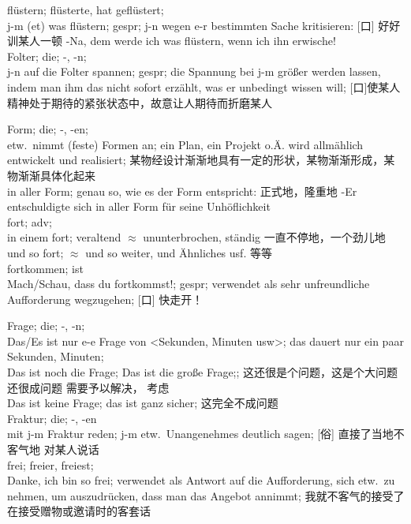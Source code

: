 \noindent
fl\"ustern; fl\"usterte, hat gefl\"ustert;\\
j-m (et) was fl\"ustern; gespr; j-n wegen e-r bestimmten Sache kritisieren: [口] 好好训某人一顿 -Na, dem werde ich was fl\"ustern, wenn ich ihn erwische! \\

\noindent
Folter; die; -, -n;\\
j-n auf die Folter spannen; gespr; die Spannung bei j-m gr\"o\ss{}er werden lassen, indem man ihm das nicht sofort erz\"ahlt, was er unbedingt wissen will; [口]使某人精神处于期待的紧张状态中，故意让人期待而折磨某人

\noindent
Form; die; -, -en; \\
etw.\ nimmt (feste) Formen an; ein Plan, ein Projekt o.\"A. wird allm\"ahlich entwickelt und realisiert; 某物经设计渐渐地具有一定的形状，某物渐渐形成，某物渐渐具体化起来\\
in aller Form; genau so, wie es der Form entspricht: 正式地，隆重地 -Er entschuldigte sich in aller Form f\"ur seine Unh\"oflichkeit \\

\noindent
fort; adv; \\
in einem fort; veraltend $\approx$ ununterbrochen, st\"andig 一直不停地，一个劲儿地\\
und so fort; $\approx$ und so weiter, und \"Ahnliches usf. 等等\\

\noindent
fortkommen; ist \\
Mach/Schau, dass du fortkommst!; gespr; verwendet als sehr unfreundliche Aufforderung wegzugehen; [口] 快走开！

\noindent
Frage; die; -, -n; \\
Das/Es ist nur e-e Frage von <Sekunden, Minuten usw>; das dauert nur ein paar Sekunden, Minuten; \\
Das ist noch die Frage; Das ist die gro\ss{}e Frage;; 这还很是个问题，这是个大问题 还很成问题 需要予以解决， 考虑 \\
Das ist keine Frage; das ist ganz sicher; 这完全不成问题 \\

\noindent
Fraktur; die; -, -en\\
mit j-m Fraktur reden; j-m etw.\ Unangenehmes deutlich sagen; [俗] 直接了当地不客气地 对某人说话\\

\noindent
frei; freier, freiest;\\
Danke, ich bin so frei; verwendet als Antwort auf die Aufforderung, sich etw.\ zu nehmen, um auszudr\"ucken, dass man das Angebot annimmt; 我就不客气的接受了 在接受赠物或邀请时的客套话\\

